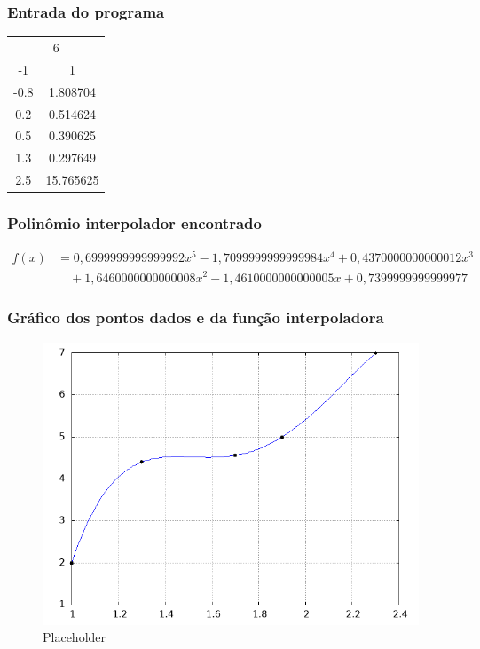 \documentclass{article}
\begin{document}
        \subsubsection{Entrada do programa}
            \begin{table}[ht!]
            \centering
            \begin{tabular}{cc}
            \multicolumn{2}{c}{6} \\
            -1   & 1 \\
            -0.8 &  1.808704 \\
            0.2 &  0.514624 \\
            0.5 & 0.390625 \\
            1.3 & 0.297649 \\
            2.5 &  15.765625 \\
            \end{tabular}
            \end{table}
        
        \subsubsection{Polinômio interpolador encontrado}
            \begin{align*}
            f(x) &= 0{,}6999999999999992x^5 - 1{,}7099999999999984x^4 + 0{,}4370000000000012x^3 \\
                &\quad + 1{,}6460000000000008x^2 - 1{,}4610000000000005x + 0{,}7399999999999977
            \end{align*}


        \subsubsection{Gráfico dos pontos dados e da função interpoladora}
            \begin{figure}[H]
                \centering
                \includegraphics[width=0.5\linewidth]{saida.png}
                \caption{Placeholder}
                \label{fig:placeholder}
            \end{figure}
\end{document}
